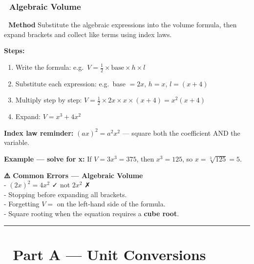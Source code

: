 \documentclass[
  letterpaper,
  DIV=11,
  numbers=noendperiod]{scrreprt}
\providecommand{\tightlist}{%
  \setlength{\itemsep}{0pt}\setlength{\parskip}{0pt}}
\theoremstyle{definition}
\theoremstyle{remark}
\begin{document}
\subsubsection*{🔣 Algebraic Volume}\label{algebraic-volume}

\textbf{📝 Method} Substitute the algebraic expressions into the volume
formula, then expand brackets and collect like terms using index laws.

\textbf{Steps:}

\begin{enumerate}
\def\labelenumi{\arabic{enumi}.}
\tightlist
\item
  Write the formula:
  e.g.~\(V = \tfrac{1}{2} \times \text{base} \times h \times l\)
\item
  Substitute each expression: e.g.~base \(= 2x\), \(h = x\),
  \(l = (x+4)\)
\item
  Multiply step by step:
  \(V = \tfrac{1}{2} \times 2x \times x \times (x+4) = x^2(x+4)\)
\item
  Expand: \(V = x^3 + 4x^2\)
\end{enumerate}

\textbf{Index law reminder:} \((ax)^2 = a^2x^2\) --- square both the
coefficient AND the variable.

\textbf{Example --- solve for x:} If \(V = 3x^3 = 375\), then
\(x^3 = 125\), so \(x = \sqrt[3]{125} = 5\).

\textbf{⚠️ Common Errors --- Algebraic Volume}\\
- \((2x)^2 = 4x^2\) ✓ not \(2x^2\) ✗\\
- Stopping before expanding all brackets.\\
- Forgetting \(V =\) on the left-hand side of the formula.\\
- Square rooting when the equation requires a \textbf{cube root}.

\begin{center}\rule{0.5\linewidth}{0.5pt}\end{center}

\section{📏 Part A --- Unit Conversions}\label{sec-conversions}
\end{document}
